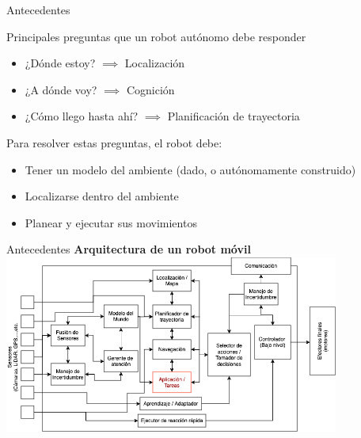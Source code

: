 \documentclass[24pt,aspectratio=169]{beamer}
\begin{document}
\begin{frame}[fragile]{Antecedentes}
  
  Principales preguntas que un robot autónomo debe responder \footnotemark\\
  \begin{itemize}
  \item ¿Dónde estoy? $\implies$ Localización 
  \item ¿A dónde voy? $\implies$ Cognición
  \item ¿Cómo llego hasta ahí? $\implies$ Planificación de trayectoria
  \end{itemize}
  Para resolver estas preguntas, el robot debe:\\
  \begin{itemize}
  \item Tener un modelo del ambiente (dado, o autónomamente construido)
  \item Localizarse dentro del ambiente
  \item Planear y ejecutar sus movimientos
  \end{itemize}

  
\end{frame}

\begin{frame}{Antecedentes}
  \centering
  \textbf{Arquitectura de un robot móvil}
  \bigskip %
  \includegraphics[width=11cm]{arquitectura_robots}\\
\end{frame}
\end{document}
